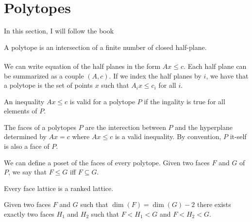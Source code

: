 \section{Polytopes}

In this section, I will follow the book \cite{polytopes}

\begin{definition}[Polytope]
  A polytope is an intersection of a finite number of closed half-plane.
\end{definition}

\paragraph{}
We can write equation of the half planes in the form $Ax \le c$. Each half plane can be summarized as a couple $(A,c)$. If we index the half planes by $i$, we have that a polytope is the set of points $x$ such that $A_i x \le c_i$ for all $i$.

\begin{definition}
  An inequality $Ax \le c$ is valid for a polytope $P$ if the ingality is true for all elements of $P$.
\end{definition}

\begin{definition}
  The faces of a polytopes $P$ are the interection between $P$ and the hyperplane determined by $Ax = c$ where $Ax \le c$ is a valid inequality. By convention, $P$ it-self is also a face of $P$.
\end{definition}

\begin{definition}
  We can define a poset of the faces of every polytope. Given two faces $F$ and $G$ of $P$, we say that $F \le G$ iff $F \subseteq G$.
\end{definition}

\begin{proposition}
  Every face lattice is a ranked lattice.
\end{proposition}

\begin{proposition}
  Given two faces $F$ and $G$ such that $\dim(F) = \dim(G) - 2$ there exists exactly two faces $H_1$ and $H_2$ such that $F < H_1 < G$ and $F < H_2 < G$.
\end{proposition}
